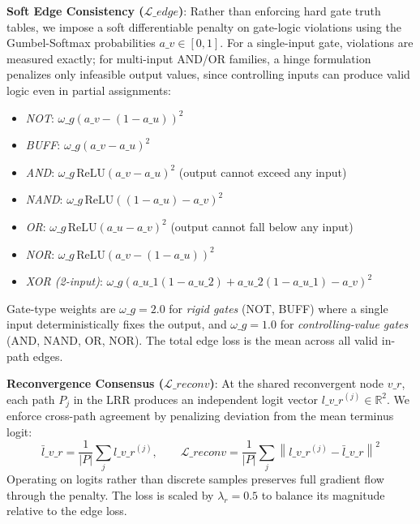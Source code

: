 \documentclass[conference]{IEEEtran}
\begin{document}
\textbf{Soft Edge Consistency ($\mathcal{L}\_{edge}$)}: Rather than enforcing hard gate truth tables, we impose a soft differentiable penalty on gate-logic violations using the Gumbel-Softmax probabilities $a\_v \in [0,1]$. For a single-input gate, violations are measured exactly; for multi-input AND/OR families, a hinge formulation penalizes only infeasible output values, since controlling inputs can produce valid logic even in partial assignments:
\begin{itemize}
   \item \textit{NOT}: $\omega\_g (a\_v - (1-a\_u))^2$
   \item \textit{BUFF}: $\omega\_g (a\_v - a\_u)^2$
   \item \textit{AND}: $\omega\_g \,\text{ReLU}(a\_v - a\_u)^2$ \quad (output cannot exceed any input)
   \item \textit{NAND}: $\omega\_g \,\text{ReLU}((1-a\_u) - a\_v)^2$
   \item \textit{OR}: $\omega\_g \,\text{ReLU}(a\_u - a\_v)^2$ \quad (output cannot fall below any input)
   \item \textit{NOR}: $\omega\_g \,\text{ReLU}(a\_v - (1-a\_u))^2$
   \item \textit{XOR (2-input)}: $\omega\_g (a\_{u\_1}(1-a\_{u\_2}) + a\_{u\_2}(1-a\_{u\_1}) - a\_v)^2$
\end{itemize}
Gate-type weights are $\omega\_g = 2.0$ for \textit{rigid gates} (NOT, BUFF) where a single input deterministically fixes the output, and $\omega\_g = 1.0$ for \textit{controlling-value gates} (AND, NAND, OR, NOR). The total edge loss is the mean across all valid in-path edges.

\textbf{Reconvergence Consensus ($\mathcal{L}\_{reconv}$)}: At the shared reconvergent node $v\_r$, each path $P_j$ in the LRR produces an independent logit vector $l\_{v\_r}^{(j)} \in \mathbb{R}^2$. We enforce cross-path agreement by penalizing deviation from the mean terminus logit:
\begin{equation}
   \bar{l}\_{v\_r} = \frac{1}{|P|}\sum_j l\_{v\_r}^{(j)}, \qquad
   \mathcal{L}\_{reconv} = \frac{1}{|P|}\sum_j \left\| l\_{v\_r}^{(j)} - \bar{l}\_{v\_r} \right\|^2
\end{equation}
Operating on logits rather than discrete samples preserves full gradient flow through the penalty. The loss is scaled by $\lambda_r = 0.5$ to balance its magnitude relative to the edge loss.
\end{document}
